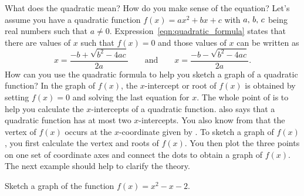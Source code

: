 \documentclass[a4paper,oneside,12pt]{article}
\begin{document}
What does the quadratic  mean?  How do
you make sense of the equation?  Let's assume you have a quadratic
function $f(x) = ax^2 + bx + c$ with ${a},\, {b},\, {c}$ being real
numbers such that $a \neq 0$.
Expression~\eqref{eqn:quadratic_formula} states that there are values
of $x$ such that $f(x) = 0$ and those values of $x$ can be written as
\[
x
=
\frac{
  -b + \sqrt{b^2 - 4ac}
}{
  2a
}
\qquad
\text{and}
\qquad
x
=
\frac{
  -b - \sqrt{b^2 - 4ac}
}{
  2a
}.
\]
How can you use the quadratic formula to help you sketch a graph of a
quadratic function?  In the graph of $f(x)$, the $x$-intercept or root
of $f(x)$ is obtained by setting $f(x) = 0$ and solving the last
equation for $x$.  The whole point of 
is to help you calculate the $x$-intercepts of a quadratic function.
 also says that a quadratic function
has at most two $x$-intercepts.  You also know
from  that the vertex of $f(x)$ occurs at
the $x$-coordinate given by .
To sketch a graph of $f(x)$, you first calculate the vertex and roots
of $f(x)$.  You then plot the three points on one set of coordinate
axes and connect the dots to obtain a graph of $f(x)$.  The next
example should help to clarify the theory.

\begin{example}
Sketch a graph of the function $f(x) = x^2 - x - 2$.
\end{example}
\end{document}
